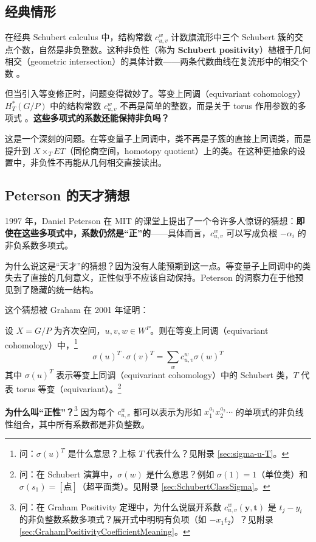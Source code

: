 \subsection{经典情形}

在经典 Schubert calculus 中，结构常数 $c_{u,v}^w$ 计数旗流形中三个 Schubert 簇的交点个数，自然是非负整数。这种非负性（称为 \textbf{Schubert positivity}）植根于几何相交（geometric intersection）的具体计数——两条代数曲线在复流形中的相交个数 \cite[\S 1]{Chevalley1994}。

但当引入等变修正时，问题变得微妙了。等变上同调（equivariant cohomology）$H_T^*(G/P)$ 中的结构常数 $c_{u,v}^w$ 不再是简单的整数，而是关于 torus 作用参数的多项式 \cite{Borel1957,AndersonFulton}。\textbf{这些多项式的系数还能保持非负吗？}

这是一个深刻的问题。在等变量子上同调中，类不再是子簇的直接上同调类，而是提升到 $X \times_T ET$（同伦商空间，homotopy quotient）上的类。在这种更抽象的设置中，非负性不再能从几何相交直接读出。

\subsection{Peterson 的天才猜想}

1997 年，Daniel Peterson 在 MIT 的课堂上提出了一个令许多人惊讶的猜想：\textbf{即使在这些多项式中，系数仍然是``正''的}——具体而言，$c_{u,v}^w$ 可以写成负根 $-\alpha_i$ 的非负系数多项式。

为什么说这是``天才''的猜想？因为没有人能预期到这一点。等变量子上同调中的类失去了直接的几何意义，正性似乎不应该自动保持。Peterson 的洞察力在于他预见到了隐藏的统一结构。

这个猜想被 Graham 在 2001 年证明：

\begin{Theorem}
\label{th:GrahamPositivityRefined}
设 $X = G/P$ 为齐次空间，$u, v, w \in W^P$。则在等变上同调（equivariant cohomology）中，\footnote{问：$\sigma(u)^T$ 是什么意思？上标 $T$ 代表什么？见附录 \cref{sec:sigma-u-T}。}
$$\sigma(u)^T \cdot \sigma(v)^T = \sum_w c_{u,v}^w \sigma(w)^T$$
其中 $\sigma(u)^T$ 表示等变上同调（equivariant cohomology）中的 Schubert 类，$T$ 代表 torus 等变（equivariant）。\footnote{问：在 Schubert 演算中，$\sigma(w)$ 是什么意思？例如 $\sigma(1) = 1$（单位类）和 $\sigma(s_1) = [\text{点}]$（超平面类）。见附录 \cref{sec:SchubertClassSigma}。}
\end{Theorem}

\textbf{为什么叫``正性''？}\footnote{问：在 Graham Positivity 定理中，为什么说展开系数 $c^w_{u,v}(\mathbf{y}, \mathbf{t})$ 是 $t_j - y_i$ 的非负整数系数多项式？展开式中明明有负项（如 $-x_1t_2$）？见附录 \cref{sec:GrahamPositivityCoefficientMeaning}。} 因为每个 $c_{u,v}^w$ 都可以表示为形如 $x_1^{a_1} x_2^{a_2} \cdots$ 的单项式的非负线性组合，其中所有系数都是非负整数。

